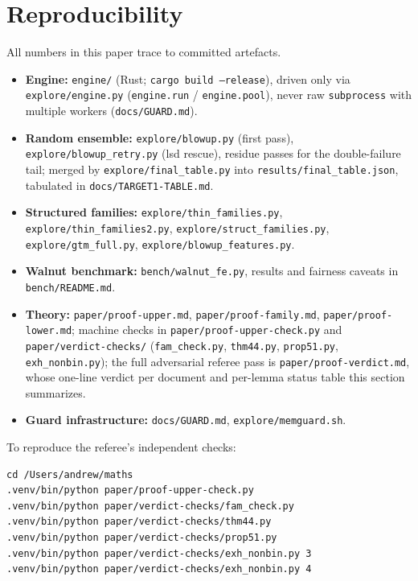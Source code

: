 \documentclass[11pt]{article}
\begin{document}
\section{Reproducibility}
\label{sec:repro}

All numbers in this paper trace to committed artefacts.

\begin{itemize}
\item \textbf{Engine:} \texttt{engine/} (Rust; \texttt{cargo build --release}), driven
only via \texttt{explore/engine.py} (\texttt{engine.run} / \texttt{engine.pool}), never
raw \texttt{subprocess} with multiple workers (\texttt{docs/GUARD.md}).
\item \textbf{Random ensemble:} \texttt{explore/blowup.py} (first pass),
\texttt{explore/blowup\_retry.py} (lsd rescue), residue passes for the double-failure
tail; merged by \texttt{explore/final\_table.py} into
\texttt{results/final\_table.json}, tabulated in \texttt{docs/TARGET1-TABLE.md}.
\item \textbf{Structured families:} \texttt{explore/thin\_families.py},
\texttt{explore/thin\_families2.py}, \texttt{explore/struct\_families.py},
\texttt{explore/gtm\_full.py}, \texttt{explore/blowup\_features.py}.
\item \textbf{Walnut benchmark:} \texttt{bench/walnut\_fe.py}, results and fairness
caveats in \texttt{bench/README.md}.
\item \textbf{Theory:} \texttt{paper/proof-upper.md}, \texttt{paper/proof-family.md},
\texttt{paper/proof-lower.md}; machine checks in
\texttt{paper/proof-upper-check.py} and \texttt{paper/verdict-checks/}
(\texttt{fam\_check.py}, \texttt{thm44.py}, \texttt{prop51.py}, \texttt{exh\_nonbin.py});
the full adversarial referee pass is \texttt{paper/proof-verdict.md}, whose one-line
verdict per document and per-lemma status table this section summarizes.
\item \textbf{Guard infrastructure:} \texttt{docs/GUARD.md}, \texttt{explore/memguard.sh}.
\end{itemize}

To reproduce the referee's independent checks:
\begin{verbatim}
cd /Users/andrew/maths
.venv/bin/python paper/proof-upper-check.py
.venv/bin/python paper/verdict-checks/fam_check.py
.venv/bin/python paper/verdict-checks/thm44.py
.venv/bin/python paper/verdict-checks/prop51.py
.venv/bin/python paper/verdict-checks/exh_nonbin.py 3
.venv/bin/python paper/verdict-checks/exh_nonbin.py 4
\end{verbatim}
\end{document}
